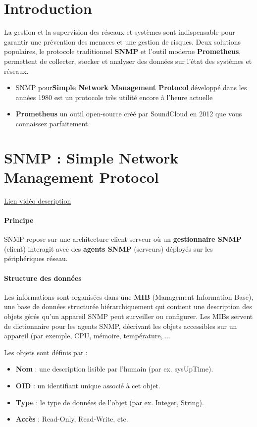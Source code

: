 \documentclass[french, 12pt]{article}%
\newcommand{\itemE}{\item[$\bullet$]}
\begin{document}
\section*{Introduction}
La gestion et la supervision des réseaux et systèmes sont indispensable pour garantir une prévention des menaces et une gestion de risques. Deux solutions populaires, le protocole traditionnel \textbf{SNMP} et l'outil moderne \textbf{Prometheus}, permettent de collecter, stocker et analyser des données sur l’état des systèmes et réseaux. 
\begin{itemize}
\itemE SNMP pour\textbf{Simple Network Management Protocol} développé dans les années 1980 est un protocole très utilité encore à l'heure actuelle
\itemE \textbf{Prometheus}  un outil open-source créé par SoundCloud en 2012 que vous connaissez parfaitement.
\end{itemize}


\section{SNMP : Simple Network Management Protocol}

\href{https://www.youtube.com/watch?v=cMiOoQTAYcU&ab_channel=InformatiqueSansComplexe\%21}{Lien vidéo description}

\paragraph{Principe}
SNMP repose sur une architecture client-serveur où un \textbf{gestionnaire SNMP} (client) interagit avec des \textbf{agents SNMP} (serveurs) déployés sur les périphériques réseau.

\paragraph{Structure des données}
Les informations sont organisées dans une \textbf{MIB} (Management Information Base), une base de données structurée hiérarchiquement qui contient une description des objets gérés qu’un appareil SNMP peut surveiller ou configurer. Les MIBs servent de dictionnaire pour les agents SNMP, décrivant les objets accessibles sur un appareil (par exemple, CPU, mémoire, température, ...

Les objets sont définis par : 

\begin{itemize}
\itemE \textbf{Nom} : une description lisible par l'humain (par ex. sysUpTime).
\itemE \textbf{OID} : un identifiant unique associé à cet objet.
\itemE \textbf{Type} : le type de données de l’objet (par ex. Integer, String).
\itemE \textbf{Accès} : Read-Only, Read-Write, etc.
\end{itemize}
\end{document}
